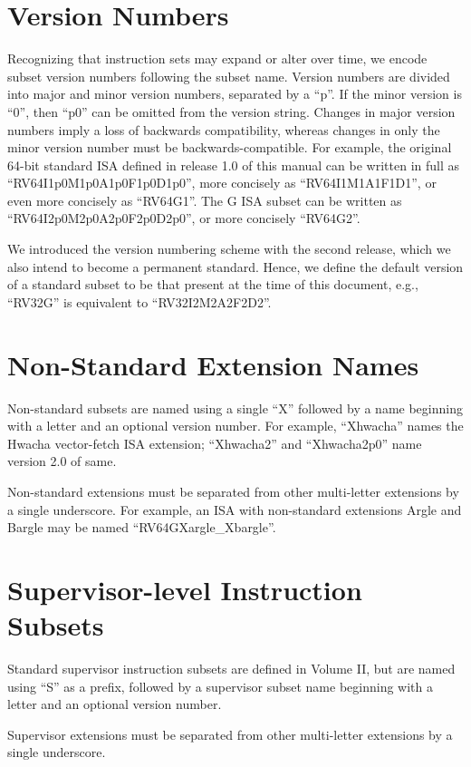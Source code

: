 \section{Version Numbers}
Recognizing that instruction sets may expand or alter over time, we
encode subset version numbers following the subset name.  Version
numbers are divided into major and minor version numbers, separated by
a ``p''.  If the minor version is ``0'', then ``p0'' can be omitted
from the version string.  Changes in major version numbers imply a
loss of backwards compatibility, whereas changes in only the minor
version number must be backwards-compatible.  For example, the
original 64-bit standard ISA defined in release 1.0 of this manual can
be written in full as ``RV64I1p0M1p0A1p0F1p0D1p0'', more concisely as
``RV64I1M1A1F1D1'', or even more concisely as ``RV64G1''.  The G ISA
subset can be written as ``RV64I2p0M2p0A2p0F2p0D2p0'', or more
concisely ``RV64G2''.

We introduced the version numbering scheme with the second release,
which we also intend to become a permanent standard.  Hence, we define
the default version of a standard subset to be that present at the
time of this document, e.g., ``RV32G'' is equivalent to
``RV32I2M2A2F2D2''.

\section{Non-Standard Extension Names}

Non-standard subsets are named using a single ``X'' followed by a name
beginning with a letter and an optional version number.
For example, ``Xhwacha'' names the Hwacha vector-fetch ISA extension;
``Xhwacha2'' and ``Xhwacha2p0'' name version 2.0 of same.

Non-standard extensions must be separated from other multi-letter extensions
by a single underscore.  For example, an ISA with non-standard extensions
Argle and Bargle may be named ``RV64GXargle\_Xbargle''.

\section{Supervisor-level Instruction Subsets}
Standard supervisor instruction subsets are defined in Volume II, but
are named using ``S'' as a prefix, followed by a supervisor subset name
beginning with a letter and an optional version number.

Supervisor extensions must be separated from other multi-letter extensions
by a single underscore.

